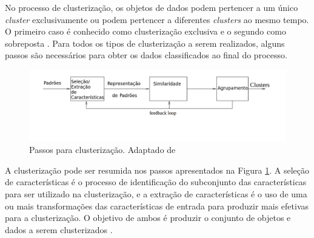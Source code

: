 No processo de clusterização, os objetos de dados podem pertencer a um único \textit{cluster} exclusivamente ou podem
pertencer a diferentes \textit{clusters} ao mesmo tempo. O primeiro caso é conhecido como clusterização exclusiva e o segundo como sobreposta \cite{tan2013data}. 
Para todos os tipos de clusterização a serem realizados, alguns passos são necessários para obter os dados classificados ao final do processo.
% 
% 
% 


\begin{figure}[h!]
\centering
\includegraphics[scale=0.6]{figuras/tasks_clustering.png}
\caption{Passos para clusterização. Adaptado de }
\label{fig:tasks_clustering}
\end{figure}

A clusterização pode ser resumida nos passos apresentados na Figura \ref{fig:tasks_clustering}.
A seleção de características é o processo de identificação do subconjunto das características para ser utilizado na clusterização, 
e a extração de características é o uso de uma ou mais transformações das características de entrada para 
produzir mais efetivas para a clusterização. O objetivo de ambos é produzir o conjunto de objetos e dados a serem clusterizados \cite{clustering_review}.

